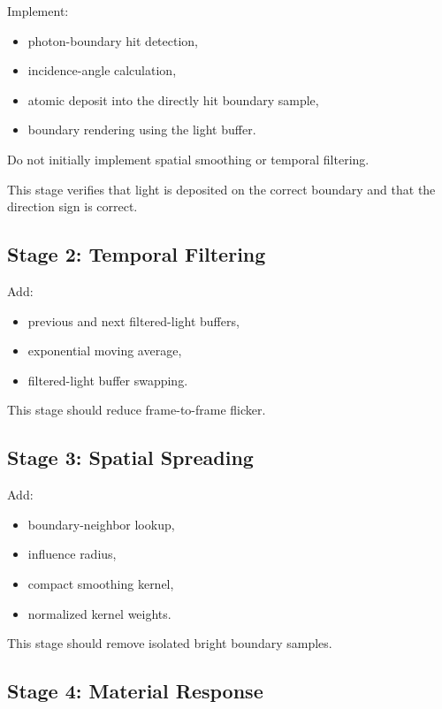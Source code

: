 \documentclass[11pt]{article}
\begin{document}
Implement:

\begin{itemize}
    \item photon-boundary hit detection,
    \item incidence-angle calculation,
    \item atomic deposit into the directly hit boundary sample,
    \item boundary rendering using the light buffer.
\end{itemize}

Do not initially implement spatial smoothing or temporal filtering.

This stage verifies that light is deposited on the correct boundary and that the
direction sign is correct.

\subsection{Stage 2: Temporal Filtering}

Add:

\begin{itemize}
    \item previous and next filtered-light buffers,
    \item exponential moving average,
    \item filtered-light buffer swapping.
\end{itemize}

This stage should reduce frame-to-frame flicker.

\subsection{Stage 3: Spatial Spreading}

Add:

\begin{itemize}
    \item boundary-neighbor lookup,
    \item influence radius,
    \item compact smoothing kernel,
    \item normalized kernel weights.
\end{itemize}

This stage should remove isolated bright boundary samples.

\subsection{Stage 4: Material Response}
\end{document}
